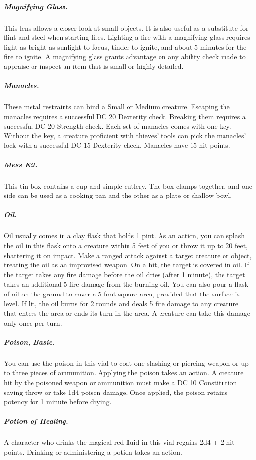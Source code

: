 \subparagraph*{Magnifying Glass.} This lens allows a closer look at small objects. It is also useful as a substitute for flint and steel when starting fires. Lighting a fire with a magnifying glass requires light as bright as sunlight to focus, tinder to ignite, and about 5 minutes for the fire to ignite. A magnifying glass grants advantage on any ability check made to appraise or inspect an item that is small or highly detailed.

\subparagraph*{Manacles.} These metal restraints can bind a Small or Medium creature. Escaping the manacles requires a successful DC 20 Dexterity check. Breaking them requires a successful DC 20 Strength check. Each set of manacles comes with one key. Without the key, a creature proficient with thieves' tools can pick the manacles' lock with a successful DC 15 Dexterity check. Manacles have 15 hit points.

\subparagraph*{Mess Kit.} This tin box contains a cup and simple cutlery. The box clamps together, and one side can be used as a cooking pan and the other as a plate or shallow bowl.

\subparagraph*{Oil.} Oil usually comes in a clay flask that holds 1 pint. As an action, you can splash the oil in this flask onto a creature within 5 feet of you or throw it up to 20 feet, shattering it on impact. Make a ranged attack against a target creature or object, treating the oil as an improvised weapon. On a hit, the target is covered in oil. If the target takes any fire damage before the oil dries (after 1 minute), the target takes an additional 5 fire damage from the burning oil. You can also pour a flask of oil on the ground to cover a 5-foot-square area, provided that the surface is level. If lit, the oil burns for 2 rounds and deals 5 fire damage to any creature that enters the area or ends its turn in the area. A creature can take this damage only once per turn.

\subparagraph*{Poison, Basic.} You can use the poison in this vial to coat one slashing or piercing weapon or up to three pieces of ammunition. Applying the poison takes an action. A creature hit by the poisoned weapon or ammunition must make a DC 10 Constitution saving throw or take 1d4 poison damage. Once applied, the poison retains potency for 1 minute before drying.

\subparagraph*{Potion of Healing.} A character who drinks the magical red fluid in this vial regains 2d4 + 2 hit points. Drinking or administering a potion takes an action.

